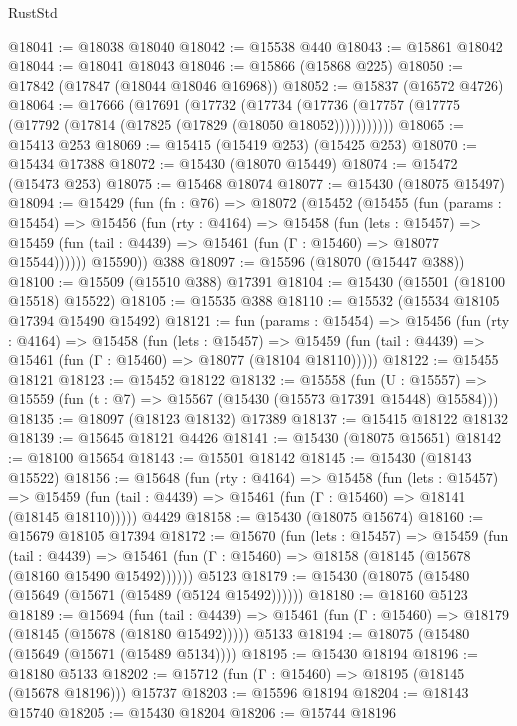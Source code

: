 \begin{lexlean}{RustStd}
\begin{coremodule}
{\begin{coremodule}
{{{{{{{{{{{{{{{{{{{{{{{{{{{{{{{{{{{{{{{{{{{{{{{{{{{{{{{{{{{{@18041 := @18038 @18040
@18042 := @15538 @440
@18043 := @15861 @18042
@18044 := @18041 @18043
@18046 := @15866 (@15868 @225)
@18050 := @17842 (@17847 (@18044 @18046 @16968))
@18052 := @15837 (@16572 @4726)
@18064 := @17666
    (@17691
      (@17732
        (@17734 (@17736 (@17757 (@17775 (@17792 (@17814 (@17825 (@17829 (@18050 @18052)))))))))))
@18065 := @15413 @253
@18069 := @15415 (@15419 @253) (@15425 @253)
@18070 := @15434 @17388
@18072 := @15430 (@18070 @15449)
@18074 := @15472 (@15473 @253)
@18075 := @15468 @18074
@18077 := @15430 (@18075 @15497)
@18094 := @15429
    (fun (fn : @76) =>
    @18072
      (@15452
        (@15455
          (fun (params : @15454) =>
          @15456
            (fun (rty : @4164) =>
            @15458
              (fun (lets : @15457) =>
              @15459 (fun (tail : @4439) => @15461 (fun (Γ : @15460) => @18077 @15544))))))
        @15590))
    @388
@18097 := @15596 (@18070 (@15447 @388))
@18100 := @15509 (@15510 @388) @17391
@18104 := @15430 (@15501 (@18100 @15518) @15522)
@18105 := @15535 @388
@18110 := @15532 (@15534 @18105 @17394 @15490 @15492)
@18121 := fun (params : @15454) =>
  @15456
    (fun (rty : @4164) =>
    @15458
      (fun (lets : @15457) =>
      @15459 (fun (tail : @4439) => @15461 (fun (Γ : @15460) => @18077 (@18104 @18110)))))
@18122 := @15455 @18121
@18123 := @15452 @18122
@18132 := @15558
    (fun (U : @15557) => @15559 (fun (t : @7) => @15567 (@15430 (@15573 @17391 @15448) @15584)))
@18135 := @18097 (@18123 @18132) @17389
@18137 := @15415 @18122 @18132
@18139 := @15645 @18121 @4426
@18141 := @15430 (@18075 @15651)
@18142 := @18100 @15654
@18143 := @15501 @18142
@18145 := @15430 (@18143 @15522)
@18156 := @15648
    (fun (rty : @4164) =>
    @15458
      (fun (lets : @15457) =>
      @15459 (fun (tail : @4439) => @15461 (fun (Γ : @15460) => @18141 (@18145 @18110)))))
    @4429
@18158 := @15430 (@18075 @15674)
@18160 := @15679 @18105 @17394
@18172 := @15670
    (fun (lets : @15457) =>
    @15459
      (fun (tail : @4439) =>
      @15461 (fun (Γ : @15460) => @18158 (@18145 (@15678 (@18160 @15490 @15492))))))
    @5123
@18179 := @15430 (@18075 (@15480 (@15649 (@15671 (@15489 (@5124 @15492))))))
@18180 := @18160 @5123
@18189 := @15694
    (fun (tail : @4439) => @15461 (fun (Γ : @15460) => @18179 (@18145 (@15678 (@18180 @15492)))))
    @5133
@18194 := @18075 (@15480 (@15649 (@15671 (@15489 @5134))))
@18195 := @15430 @18194
@18196 := @18180 @5133
@18202 := @15712 (fun (Γ : @15460) => @18195 (@18145 (@15678 @18196))) @15737
@18203 := @15596 @18194
@18204 := @18143 @15740
@18205 := @15430 @18204
@18206 := @15744 @18196
}}}}}}}}}}}}}}}}}}}}}}}}}}}}}}}}}}}}}}}}}}}}}}}}}}}}}}}}}}}}
\end{coremodule}}
\end{coremodule}
\end{lexlean}
